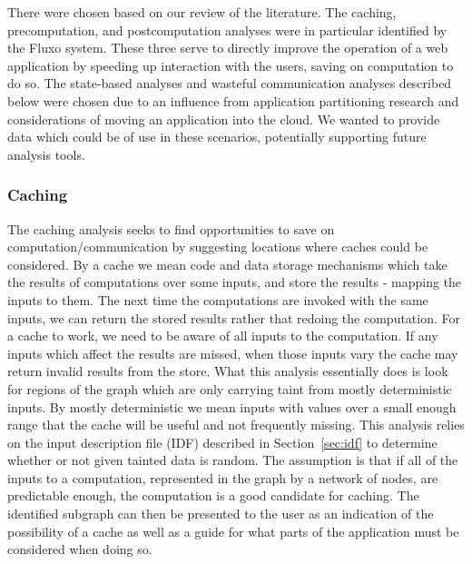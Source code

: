\documentclass[msc,oneside]{ubcthesis}
\begin{document}
There were chosen based on our review of the literature. The caching, precomputation, and postcomputation analyses were in particular identified by the Fluxo \cite{Kiciman2010} system. These three serve to directly improve the operation of a web application by speeding up interaction with the users, saving on computation to do so. The state-based analyses and wasteful communication analyses described below were chosen due to an influence from application partitioning research and considerations of moving an application into the cloud. We wanted to provide data which could be of use in these scenarios, potentially supporting future analysis tools.

\subsubsection{Caching}
The caching analysis seeks to find opportunities to save on computation/communication by suggesting locations where caches could be considered. By a cache we mean code and data storage mechanisms which take the results of computations over some inputs, and store the results - mapping the inputs to them. The next time the computations are invoked with the same inputs, we can return the stored results rather that redoing the computation. For a cache to work, we need to be aware of all inputs to the computation. If any inputs which affect the results are missed, when those inputs vary the cache may return invalid results from the store. What this analysis essentially does is look for regions of the graph which are only carrying taint from mostly deterministic inputs. By mostly deterministic we mean inputs with values over a small enough range that the cache will be useful and not frequently missing. This analysis relies on the input description file (IDF) described in Section~\ref{sec:idf} to determine whether or not given tainted data is random. The assumption is that if all of the inputs to a computation, represented in the graph by a network of nodes, are predictable enough, the computation is a good candidate for caching. The identified subgraph can then be presented to the user as an indication of the possibility of a cache as well as a guide for what parts of the application must be considered when doing so.\\
\end{document}
